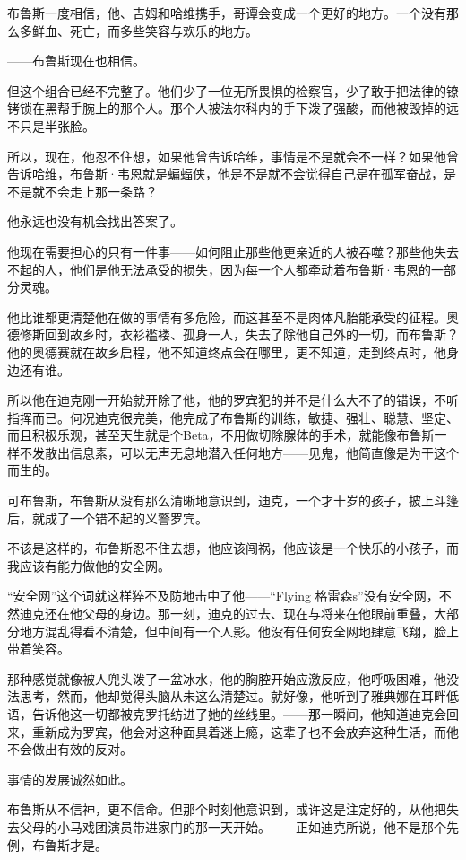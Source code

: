 \documentclass[../main]{subfiles}
\begin{document}
布鲁斯一度相信，他、吉姆和哈维携手，哥谭会变成一个更好的地方。一个没有那么多鲜血、死亡，而多些笑容与欢乐的地方。

——布鲁斯现在也相信。

但这个组合已经不完整了。他们少了一位无所畏惧的检察官，少了敢于把法律的镣铐锁在黑帮手腕上的那个人。那个人被法尔科内的手下泼了强酸，而他被毁掉的远不只是半张脸。

所以，现在，他忍不住想，如果他曾告诉哈维，事情是不是就会不一样？如果他曾告诉哈维，布鲁斯·韦恩就是蝙蝠侠，他是不是就不会觉得自己是在孤军奋战，是不是就不会走上那一条路？

他永远也没有机会找出答案了。

他现在需要担心的只有一件事——如何阻止那些他更亲近的人被吞噬？那些他失去不起的人，他们是他无法承受的损失，因为每一个人都牵动着布鲁斯·韦恩的一部分灵魂。

他比谁都更清楚他在做的事情有多危险，而这甚至不是肉体凡胎能承受的征程。奥德修斯回到故乡时，衣衫褴褛、孤身一人，失去了除他自己外的一切，而布鲁斯？他的奥德赛就在故乡启程，他不知道终点会在哪里，更不知道，走到终点时，他身边还有谁。

所以他在迪克刚一开始就开除了他，他的罗宾犯的并不是什么大不了的错误，不听指挥而已。何况迪克很完美，他完成了布鲁斯的训练，敏捷、强壮、聪慧、坚定、而且积极乐观，甚至天生就是个Beta，不用做切除腺体的手术，就能像布鲁斯一样不发散出信息素，可以无声无息地潜入任何地方——见鬼，他简直像是为干这个而生的。

可布鲁斯，布鲁斯从没有那么清晰地意识到，迪克，一个才十岁的孩子，披上斗篷后，就成了一个错不起的义警罗宾。

不该是这样的，布鲁斯忍不住去想，他应该闯祸，他应该是一个快乐的小孩子，而我应该有能力做他的安全网。

“安全网”这个词就这样猝不及防地击中了他——“Flying
格雷森s”没有安全网，不然迪克还在他父母的身边。那一刻，迪克的过去、现在与将来在他眼前重叠，大部分地方混乱得看不清楚，但中间有一个人影。他没有任何安全网地肆意飞翔，脸上带着笑容。

那种感觉就像被人兜头泼了一盆冰水，他的胸腔开始应激反应，他呼吸困难，他没法思考，然而，他却觉得头脑从未这么清楚过。就好像，他听到了雅典娜在耳畔低语，告诉他这一切都被克罗托纺进了她的丝线里。——那一瞬间，他知道迪克会回来，重新成为罗宾，他会对这种面具着迷上瘾，这辈子也不会放弃这种生活，而他不会做出有效的反对。

事情的发展诚然如此。

布鲁斯从不信神，更不信命。但那个时刻他意识到，或许这是注定好的，从他把失去父母的小马戏团演员带进家门的那一天开始。——正如迪克所说，他不是那个先例，布鲁斯才是。
\end{document}
